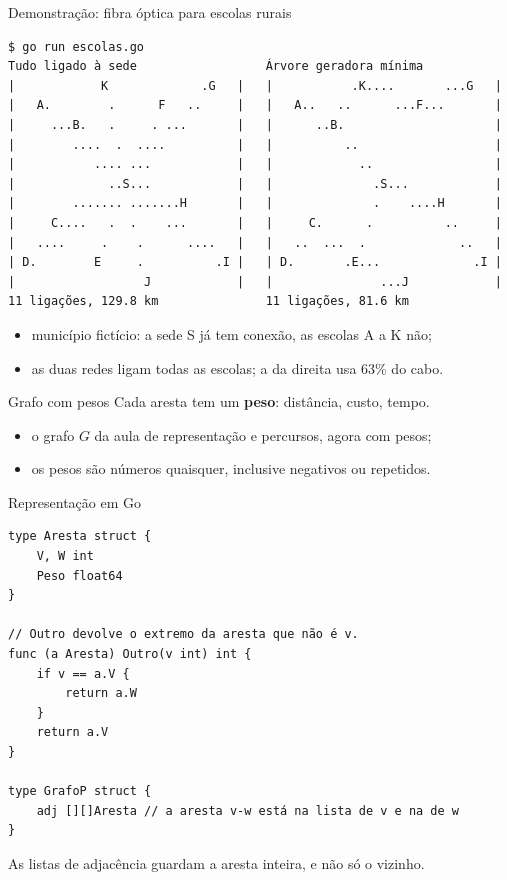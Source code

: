 \documentclass{beamer}
\begin{document}
\begin{frame}[fragile]{Demonstração: fibra óptica para escolas rurais}
	\begin{verbatim}
$ go run escolas.go
Tudo ligado à sede                  Árvore geradora mínima
|            K             .G   |   |           .K....       ...G   |
|   A.        .      F   ..     |   |   A..   ..      ...F...       |
|     ...B.   .     . ...       |   |      ..B.                     |
|        ....  .  ....          |   |          ..                   |
|           .... ...            |   |            ..                 |
|             ..S...            |   |              .S...            |
|        ....... .......H       |   |              .    ....H       |
|     C....   .  .    ...       |   |     C.      .          ..     |
|   ....     .    .      ....   |   |   ..  ...  .             ..   |
| D.        E     .          .I |   | D.       .E...             .I |
|                  J            |   |               ...J            |
11 ligações, 129.8 km               11 ligações, 81.6 km
\end{verbatim}

	\begin{itemize}
		\item município fictício: a sede S já tem conexão, as escolas A a K não;
		\item as duas redes ligam todas as escolas; a da direita usa 63\% do cabo.
	\end{itemize}
\end{frame}

\begin{frame}{Grafo com pesos}
	Cada aresta tem um \textbf{peso}: distância, custo, tempo.

	\begin{center}
		\scalebox{0.85}{\grafoGP}
	\end{center}

	\begin{itemize}
		\item o grafo $G$ da aula de representação e percursos, agora com pesos;
		\item os pesos são números quaisquer, inclusive negativos ou repetidos.
	\end{itemize}
\end{frame}

\begin{frame}[fragile]{Representação em Go}
	\begin{verbatim}
type Aresta struct {
	V, W int
	Peso float64
}

// Outro devolve o extremo da aresta que não é v.
func (a Aresta) Outro(v int) int {
	if v == a.V {
		return a.W
	}
	return a.V
}

type GrafoP struct {
	adj [][]Aresta // a aresta v-w está na lista de v e na de w
}
\end{verbatim}
	As listas de adjacência guardam a aresta inteira, e não só o vizinho.
\end{frame}
\end{document}
